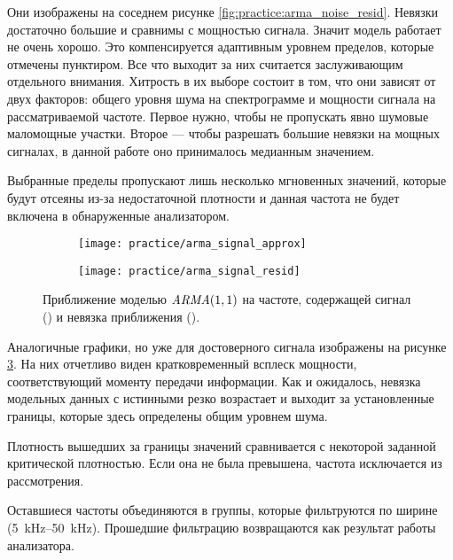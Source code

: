 Они изображены на соседнем рисунке \ref{fig:practice:arma_noise_resid}. Невязки достаточно большие и сравнимы с мощностью сигнала. Значит модель работает не очень хорошо. Это компенсируется адаптивным уровнем пределов, которые отмечены пунктиром. Все что выходит за них считается заслуживающим отдельного внимания. Хитрость в их выборе состоит в том, что они зависят от двух факторов: общего уровня шума на спектрограмме и мощности сигнала на рассматриваемой частоте. Первое нужно, чтобы не пропускать явно шумовые маломощные участки. Второе --- чтобы разрешать большие невязки на мощных сигналах, в данной работе оно принималось медианным значением.

Выбранные пределы пропускают лишь несколько мгновенных значений, которые будут отсеяны из-за недостаточной плотности и данная частота не будет включена в обнаруженные анализатором.

\begin{figure}[h]
  \centering
  \begin{subfigure}{0.45\textwidth}
    \texttt{[image: practice/arma\_signal\_approx]}
    \caption{}
    \label{fig:practice:arma_signal_approx}
  \end{subfigure}
  \begin{subfigure}{0.45\textwidth}
    \texttt{[image: practice/arma\_signal\_resid]}
    \caption{}
    \label{fig:practice:arma_signal_resid}
  \end{subfigure}
  \caption{Приближение моделью $\mathit{ARMA}(1,1)$ на частоте, содержащей сигнал () и невязка приближения ().}
  \label{fig:practice:arma_signal}
\end{figure}

Аналогичные графики, но уже для достоверного сигнала изображены на рисунке \ref{fig:practice:arma_signal}. На них отчетливо виден кратковременный всплеск мощности, соответствующий моменту передачи информации. Как и ожидалось, невязка модельных данных с истинными резко возрастает и выходит за установленные границы, которые здесь определены общим уровнем шума.

Плотность вышедших за границы значений сравнивается с некоторой заданной критической плотностью. Если она не была превышена, частота исключается из рассмотрения.

Оставшиеся частоты объединяются в группы, которые фильтруются по ширине (\SIrange{5}{50}{\kilo\hertz}). Прошедшие фильтрацию возвращаются как результат работы анализатора.

